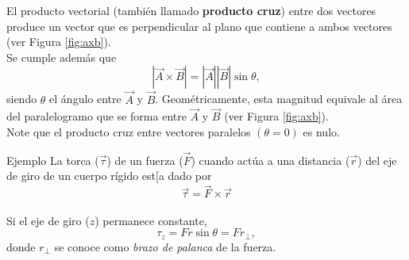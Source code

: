 

El producto vectorial (tambi\'en llamado \textbf{producto cruz}) entre dos vectores produce un vector que es perpendicular al plano que contiene a ambos vectores (ver Figura \ref{fig:axb}). \\[.35cm] 
Se cumple adem\'as que 
$$ |\vec{A}\times\vec{B}|=|\vec{A}||\vec{B}|\sin \theta,$$
siendo $\theta$ el \'angulo entre $\vec{A}$ y $\vec{B}$.  Geom\'etricamente,  esta magnitud equivale al \'area del paralelogramo que se forma entre $\vec{A}$ y $\vec{B}$ (ver Figura \ref{fig:axb}). \\[.35cm] 



Note que el producto cruz entre vectores paralelos $(\theta=0)$ es nulo. \\[.35cm] 

\begin{wwteorema}{Ejemplo}
La torca ($\vec{\tau}$) de un fuerza ($\vec{F}$) cuando act\'ua a una distancia ($\vec{r}$) del eje de giro de un cuerpo r\'igido est[a dado por 
$$\vec{\tau}=\vec{F}\times \vec{r}$$ \\[.35cm]
Si el eje de giro ($z$) permanece constante, 
$$\tau_z=Fr\sin \theta=Fr_{\perp},$$
donde $r_{\perp}$ se conoce como \textit{brazo de palanca} de la fuerza.
\end{wwteorema}
